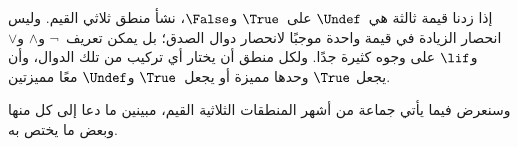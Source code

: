 \documentclass[../../../include/open-logic-section]{subfiles}
\begin{document}


إذا زدنا قيمة ثالثة هي~$\Undef$ على~$\True$ و$\False$، نشأ منطق
ثلاثي القيم. وليس انحصار الزيادة في قيمة واحدة موجبًا لانحصار دوال
الصدق؛ بل يمكن تعريف~$\lnot$ و$\land$ و$\lor$ و$\lif$ على وجوه
كثيرة جدًا. ولكل منطق أن يختار أي تركيب من تلك الدوال، وأن يجعل
$\True$ وحدها مميزة أو يجعل~$\True$ و$\Undef$ معًا مميزتين.

وسنعرض فيما يأتي جماعة من أشهر المنطقات الثلاثية القيم، مبينين ما
دعا إلى كل منها وبعض ما يختص به.
\end{document}

